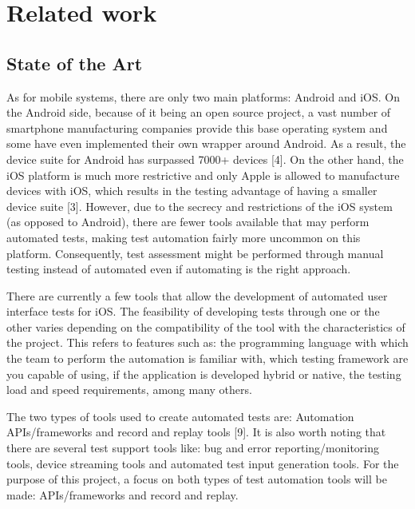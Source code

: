 \chapter{Related work}
\label{chapter2}

\section{State of the Art}

As for mobile systems, there are only two main platforms: Android and iOS. On the Android side, because of it being an open source project, a vast number of smartphone manufacturing companies provide this base operating system and some have even implemented their own wrapper around Android. As a result, the device suite for Android has surpassed 7000+ devices [4]. On the other hand, the iOS platform is much more restrictive and only Apple is allowed to manufacture devices with iOS, which results in the testing advantage of having a smaller device suite [3]. However, due to the secrecy and restrictions of the iOS system (as opposed to Android), there are fewer tools available that may perform automated tests, making test automation fairly more uncommon on this platform. Consequently, test assessment might be performed through manual testing instead of automated even if automating is the right approach.

There are currently a few tools that allow the development of automated user interface tests for iOS. The feasibility of developing tests through one or the other varies depending on the compatibility of the tool with the characteristics of the project. This refers to features such as: the programming language with which the team to perform the automation is familiar with, which testing framework are you capable of using, if the application is developed hybrid or native, the testing load and speed requirements, among many others.

The two types of tools used to create automated tests are: Automation APIs/frameworks and record and replay tools [9]. It is also worth noting that there are several test support tools like: bug and error reporting/monitoring tools, device streaming tools and automated test input generation tools. For the purpose of this project, a focus on both types of test automation tools will be made: APIs/frameworks and record and replay.

